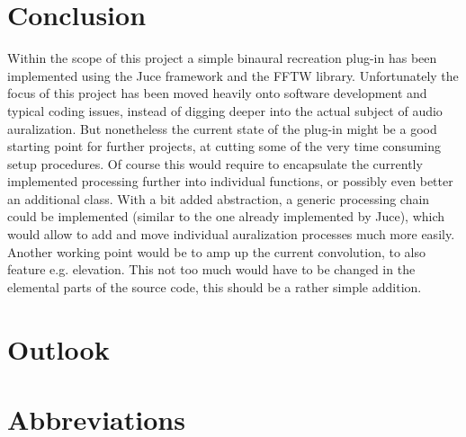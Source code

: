 \documentclass[a4paper,11pt]{article}%
\renewcommand{\\}{\vspace*{0.5\baselineskip} \newline}
\begin{document}
\section{Conclusion}
\label{sec:conclusion}
Within the scope of this project a simple binaural recreation plug-in has been implemented using the Juce framework and the FFTW library. Unfortunately the focus of this project has been moved heavily onto software development and typical coding issues, instead of digging deeper into the actual subject of audio auralization. But nonetheless the current state of the plug-in might be a good starting point for further projects, at cutting some of the very time consuming setup procedures. Of course this would require to encapsulate the currently implemented processing further into individual functions, or possibly even better an additional class. With a bit added abstraction, a generic processing chain could be implemented (similar to the one already implemented by Juce), which would allow to add and move individual auralization processes much more easily. Another working point would be to amp up the current convolution, to also feature e.g. elevation. This not too much would have to be changed in the elemental parts of the source code, this should be a rather simple addition.


\section{Outlook}
\label{sec:outlook}


\newpage
\section*{Abbreviations}
\vspace{5mm}
\begin{acronym}[SEVENLTH]
\end{acronym}

\newpage
\listoffigures
{}
\renewcommand\refname{Sources}
\begin{thebibliography}{14}
\end{thebibliography}
\end{document}
